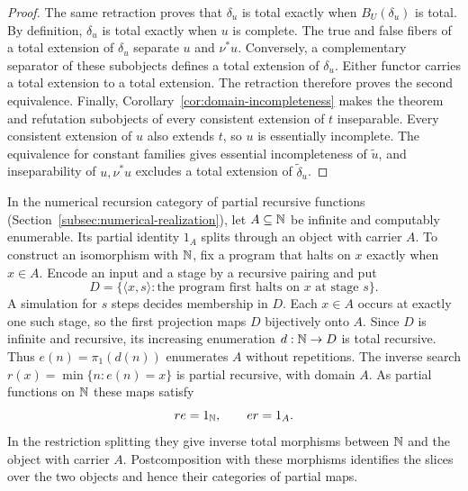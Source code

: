 \begin{proof}
The same retraction proves that $\delta_u$ is total exactly when
$B_U(\delta_u)$ is total. By definition, $\delta_u$ is total exactly
when $u$ is complete. The true and false fibers of a total extension of $\delta_u$ separate $u$ and
$\nu^*u$. Conversely, a complementary separator of these subobjects defines a
total extension of $\delta_u$. Either functor
carries a total extension to a total extension. The retraction therefore
proves the second equivalence.
Finally, Corollary~\ref{cor:domain-incompleteness} makes the theorem and
refutation subobjects of every consistent extension of $t$ inseparable.
Every consistent extension of $u$ also extends $t$, so $u$ is essentially
incomplete. The equivalence for constant families gives essential
incompleteness of $\widetilde u$, and inseparability of $u,\nu^*u$ excludes a
total extension of $\widetilde\delta_u$.
\end{proof}

In the numerical recursion category of partial recursive functions
(Section~\ref{subsec:numerical-realization}), let $A\subseteq\mathbb N$ be
infinite and computably enumerable.
Its partial identity $1_A$ splits through an object with carrier $A$.
To construct an isomorphism with $\mathbb N$, fix a program that halts on $x$
exactly when $x\in A$. Encode an input and a stage by a recursive
pairing and put
\[
 D=\{\langle x,s\rangle:\text{the program first halts on $x$ at stage $s$}\}.
\]
A simulation for $s$ steps decides membership in $D$. Each $x\in A$
occurs at exactly one such stage, so the first projection maps $D$
bijectively onto $A$. Since $D$ is infinite and recursive, its
increasing enumeration $d:\mathbb N\to D$ is total recursive. Thus
$e(n)=\pi_1(d(n))$ enumerates $A$ without repetitions. The inverse
search $r(x)=\min\{n:e(n)=x\}$ is partial recursive, with domain $A$.
As partial functions on $\mathbb N$ these maps satisfy
\[
     r e=1_{\mathbb N},\qquad e r=1_A .
\]
In the restriction splitting they give inverse total morphisms between
$\mathbb N$ and the object with carrier $A$. Postcomposition with these
morphisms identifies the slices over the two objects and hence their
categories of partial maps.

